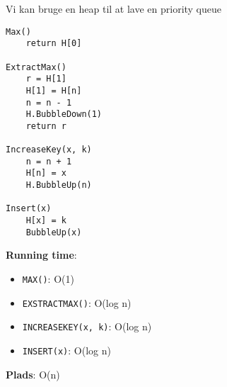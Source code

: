 Vi kan bruge en heap til at lave en priority queue\\
\begin{lstlisting}[frame=single, mathescape=true]
Max()
	return H[0]

ExtractMax()
	r = H[1]
	H[1] = H[n]
	n = n - 1
	H.BubbleDown(1)
	return r

IncreaseKey(x, k)
	n = n + 1
	H[n] = x
	H.BubbleUp(n)

Insert(x)
	H[x] = k
	BubbleUp(x)
\end{lstlisting}
\textbf{Running time}:
\begin{itemize}
	\item \texttt{MAX()}: O(1)
	\item \texttt{EXSTRACTMAX()}: O(log n)
	\item \texttt{INCREASEKEY(x, k)}: O(log n)
	\item \texttt{INSERT(x)}: O(log n)
\end{itemize}
\textbf{Plads}: O(n)